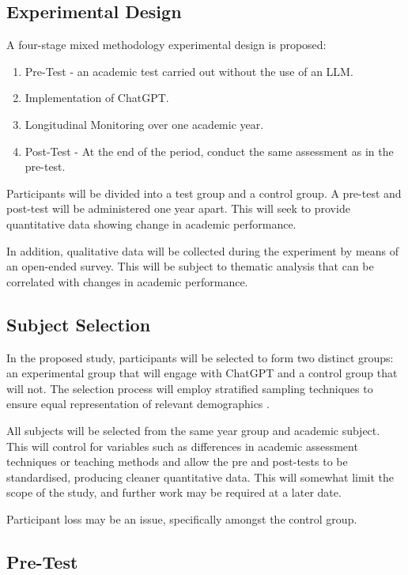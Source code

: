 \documentclass[12pt]{article}
\begin{document}
\subsection{Experimental Design}

A four-stage mixed methodology experimental design is proposed:

\begin{enumerate}
    \item Pre-Test - an academic test carried out without the use of an LLM.
    \item Implementation of ChatGPT.
    \item Longitudinal Monitoring over one academic year.
    \item Post-Test - At the end of the period, conduct the same assessment as in the pre-test.
\end{enumerate}

Participants will be divided into a test group and a control group. A pre-test and post-test will be administered one year apart. This will seek to provide quantitative data showing change in academic performance. 

In addition, qualitative data will be collected during the experiment by means of an open-ended survey. This will be subject to thematic analysis that can be correlated with changes in academic performance. 

\subsection{Subject Selection}

In the proposed study, participants will be selected to form two distinct groups: an experimental group that will engage with ChatGPT and a control group that will not. The selection process will employ stratified sampling techniques to ensure equal representation of relevant demographics \cite{mertens}.

All subjects will be selected from the same year group and academic subject. This will control for variables such as differences in academic assessment techniques or teaching methods and allow the pre and post-tests to be standardised, producing cleaner quantitative data. This will somewhat limit the scope of the study, and further work may be required at a later date.

Participant loss may be an issue, specifically amongst the control group.

\subsection{Pre-Test}
\end{document}

